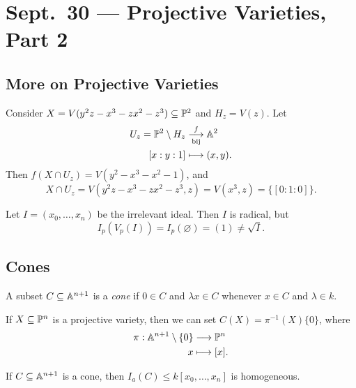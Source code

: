 \chapter{Sept.~30 --- Projective Varieties, Part 2}

\section{More on Projective Varieties}

\begin{example}
  Consider $X = V(y^2 z - x^3 - z x^2 - z^3) \subseteq \mathbb{P}^2$
  and $H_z = V(z)$. Let
  \begin{align*}
    U_z = \mathbb{P}^2 \setminus H_z
    &\underset{\text{bij}}{\overset{f}{\longrightarrow}} \mathbb{A}^2 \\
    {[x:y:1]} &\longmapsto (x, y).
  \end{align*}
  Then $f(X \cap U_z) = V(y^2 - x^3 - x^2 - 1)$,
  and
  \[
    X \cap U_z
    = V(y^2 z - x^3 - z x^2 - z^3, z)
    = V(x^3, z)
    = \{[0 : 1 : 0]\}.
  \]
\end{example}

\begin{example}
  Let $I = (x_0, \dots, x_n)$
  be the irrelevant ideal.
  Then $I$ is radical, but
  \[I_p(V_p(I)) = I_p(\varnothing) = (1) \ne \sqrt{I}.\]
\end{example}

\section{Cones}
\begin{definition}
  A subset $C \subseteq \mathbb{A}^{n + 1}$
  is a \emph{cone} if $0 \in C$ and
  $\lambda x \in C$ whenever
  $x \in C$ and $\lambda \in k$.
\end{definition}

\begin{example}
  If $X \subseteq \mathbb{P}^n$ is a projective
  variety, then we can set $C(X) = \pi^{-1}(X) \{0\}$, where
  \begin{align*}
    \pi :
    \mathbb{A}^{n + 1} \setminus \{0\}
    &\longrightarrow \mathbb{P}^n \\
    x &\longmapsto [x].
  \end{align*}
\end{example}

\begin{prop}
  If $C \subseteq \mathbb{A}^{n + 1}$
  is a cone, then $I_a(C) \le k[x_0, \dots, x_n]$
  is homogeneous.
\end{prop}

